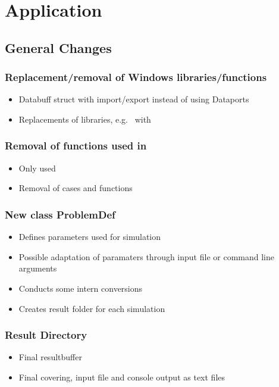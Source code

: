 \section{Application}
\subsection{General Changes}

\subsubsection{Replacement/removal of Windows libraries/functions}
\begin{itemize}[noitemsep,topsep=0pt]
\item Databuff struct with import/export instead of using Dataports
\item Replacements of libraries, e.g.\  with 
\end{itemize}

\subsubsection{Removal of functions used in }
\begin{itemize}[noitemsep,topsep=0pt]
\item Only  used
\item Removal of  cases and functions
\end{itemize}

\subsubsection{New class ProblemDef}
\begin{itemize}[noitemsep,topsep=0pt]
\item Defines parameters used for simulation
\item Possible adaptation of paramaters through input file or command line arguments
\item Conducts some intern conversions
\item Creates result folder for each simulation
\end{itemize}

\subsubsection{Result Directory}
\begin{itemize}[noitemsep,topsep=0pt]
\item Final resultbuffer
\item Final covering, input file and console output as text files
\end{itemize}
